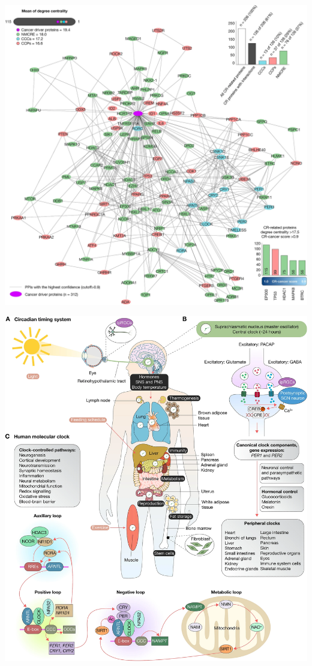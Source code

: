 \documentclass[
12pt,
openright,
oneside,
a4paper,
chapter=TITLE,
section=TITLE,
french,
spanish,
brazil,
english
]{abntex2}\usepackage{array}
\begin{document}
\includegraphics{qmd/images/perez-villa-2023-figure-3.png}

\includegraphics{qmd/images/perez-villa-2023-figure-1.png}
\end{document}
